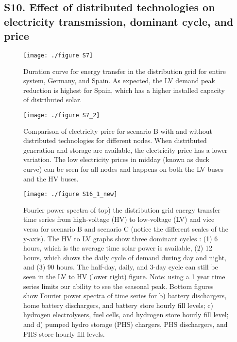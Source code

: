 	\subsection*{S10. Effect of distributed technologies on electricity transmission, dominant cycle, and price }
	
	\begin{figure}[H]
		\renewcommand*{\thefigure}{S\arabic{figure}}
		\texttt{[image: ./figure S7]}
		\caption{Duration curve for energy transfer in the distribution grid for entire system, Germany, and Spain. As expected, the LV demand peak reduction is highest for Spain, which has a higher installed capacity of distributed solar. }
	\end{figure}
	
	\begin{figure}[H]
		\renewcommand*{\thefigure}{S\arabic{figure}}
		
		\texttt{[image: ./figure S7\_2]}
		\caption{Comparison of electricity price for scenario B with and without distributed technologies for different nodes. When distributed generation and storage are available, the electricity price has a lower variation. The low electricity prices in midday (known as duck curve) can be seen for all nodes and happens on both the LV buses and the HV buses.  }
	\end{figure}
	
	\begin{figure}[H]
		\renewcommand*{\thefigure}{S\arabic{figure}}
		
		\texttt{[image: ./figure S16\_1\_new]}
		\caption{Fourier power spectra of top) the distribution grid energy transfer time series from high-voltage (HV) to low-voltage (LV) and vice versa for scenario B and scenario C (notice the different scales of the y-axis). The HV to LV graphs show three dominant cycles : (1) 6 hours, which is the average time solar power is available, (2) 12 hours, which shows the daily cycle of demand during day and night, and (3) 90 hours. The half-day, daily, and 3-day cycle can still be seen in the LV to HV (lower right) figure. Note: using a 1 year time series limits our ability to see the seasonal peak. Bottom figures show Fourier power spectra of time series for b) battery dischargers, home battery dischargers, and battery store hourly fill levels; c) hydrogen electrolysers, fuel cells, and hydrogen store hourly fill level; and d) pumped hydro storage (PHS) chargers, PHS dischargers, and PHS store hourly fill levels. 
		}
	\end{figure}
	
